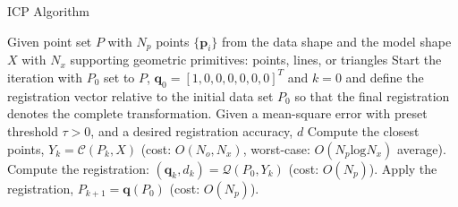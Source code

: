 \begin{algorithm}[tb!]
	\caption{ICP Algorithm 
		\label{alg:ICP}}
	\begin{algorithmic}[1]
		\State Given point set $P$ with $N_p$ points $\{\bm{p}_i\}$ from the data shape and the model shape $X$ with $N_x$ supporting geometric primitives: points, lines, or triangles
		\State Start the iteration with $P_0$ set to $P$, $\bm{q}_0 = \left[1, 0, 0, 0, 0, 0, 0 \right]^T$ and $k=0$ and define the registration vector relative to the initial data set $P_0$ so that the final registration denotes the complete transformation. 
		\State Given a mean-square error with preset threshold $\tau >0$, and a desired registration accuracy, $d$
		\State Compute the closest points, $Y_k = \mathcal{C}(P_k, X)$ (cost: $O(N_o, N_x)$, worst-case: $O(N_p \text{log} N_x)$ average).
		\State Compute the registration: $\left(\bm{q}_k, d_k\right) = \mathcal{Q}(P_0, Y_k)$ (cost: $O(N_p)$).
		\State Apply the registration, $P_{k+1} = \bm{q}(P_0)$ (cost: $O(N_p)$).
		\EndWhile
	\end{algorithmic}
\end{algorithm}

